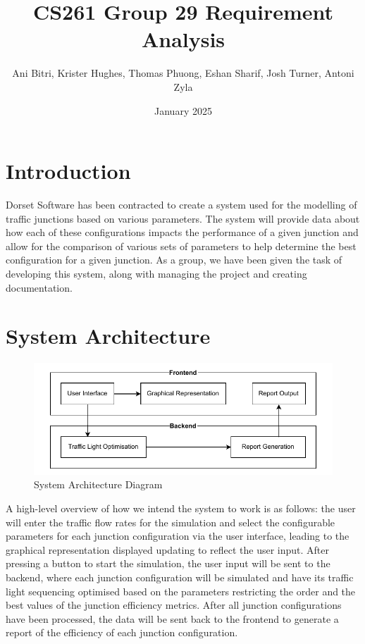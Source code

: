 \documentclass{article}
\title{CS261 Group 29 Requirement Analysis}
\author{Ani Bitri, Krister Hughes, Thomas Phuong, Eshan Sharif, Josh Turner, Antoni Zyla}
\date{January 2025}
\begin{document}
\maketitle


\section{Introduction}
Dorset Software has been contracted to create a system used for the modelling 
of traffic junctions based on various parameters. The system will provide 
data about how each of these configurations impacts the performance of a given 
junction and allow for the comparison of various sets of parameters to help 
determine the best configuration for a given junction. As a group, we have been 
given the task of developing this system, along with managing the project and 
creating documentation.

\section{System Architecture}
\begin{figure}[H]
    \centering
    \includegraphics[width=0.5\linewidth]{System architecture.drawio.pdf}
    \caption{System Architecture Diagram}
    \label{system architecture}
\end{figure}
A high-level overview of how we intend the system to work is as follows: the user will 
enter the traffic flow rates for the simulation and select the configurable parameters 
for each junction configuration via the user interface, leading to the graphical 
representation displayed updating to reflect the user input. After pressing a button to 
start the simulation, the user input will be sent to the backend, where each junction 
configuration will be simulated and have its traffic light sequencing optimised based on 
the parameters restricting the order and the best values of the junction efficiency metrics. 
After all junction configurations have been processed, the data will be sent back to the 
frontend to generate a report of the efficiency of each junction configuration.
\end{document}
